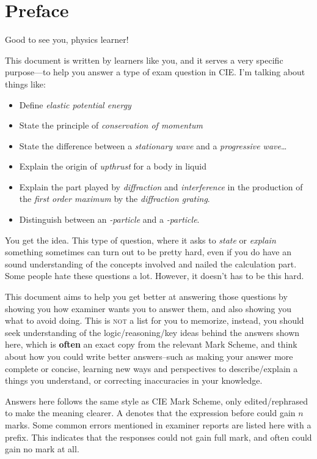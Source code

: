 \section*{Preface}

Good to see you, physics learner!

This document is written by learners like you, and it serves a very specific purpose---to help you answer
a type of exam question in CIE. I'm talking about things like:

{%
  \sffamily%
  \begin{itemize}[itemsep=0pt]
    \item Define \textit{elastic potential energy}
    \item State the principle of \textit{conservation of momentum}
    \item State the difference between a \textit{stationary wave} and a \textit{progressive wave}\ldots
    \item Explain the origin of \textit{upthrust} for a body in liquid
    \item Explain the part played by \textit{diffraction} and \textit{interference} in the production of
    the \textit{first order maximum} by the \textit{diffraction grating}.
    \item Distinguish between an \textit{\ce{\alpha}-particle} and a \textit{\ce{\beta^+}-particle}.
  \end{itemize}
}

You get the idea. This type of question, where it asks to \textit{state} or \textit{explain} something
sometimes can turn out to be pretty hard, even if you do have an sound understanding of the concepts
involved and nailed the calculation part. Some people hate these questions a lot. However, it doesn't has
to be this hard.

This document aims to help you get better at answering those questions by showing you how examiner wants
you to answer them, and also showing you what to avoid doing. This is \textsc{not} a list for you to memorize,
instead, you should seek understanding of the logic/reasoning/key ideas behind the answers shown here, which is \textbf{often}
an exact copy from the relevant Mark Scheme, and think about how you could write better answers--such as making
your answer more complete or concise, learning new ways and perspectives to describe/explain a things you understand,
or correcting inaccuracies in your knowledge.

Answers here follows the same style as CIE Mark Scheme, only edited/rephrased to make the meaning clearer. A 
denotes that the expression before  could gain $n$ marks. Some common errors mentioned in examiner reports
are listed here with a \NOT prefix. This indicates that the responses could not gain full mark, and often could
gain no mark at all.

